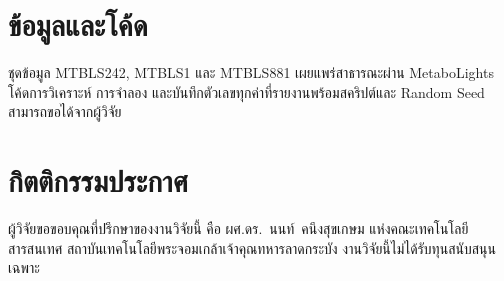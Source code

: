 \documentclass[11pt,a4paper]{article}
\begin{document}
\section*{ข้อมูลและโค้ด}
ชุดข้อมูล MTBLS242, MTBLS1 และ MTBLS881 เผยแพร่สาธารณะผ่าน MetaboLights \cite{haug2020}
โค้ดการวิเคราะห์ การจำลอง และบันทึกตัวเลขทุกค่าที่รายงานพร้อมสคริปต์และ Random Seed
สามารถขอได้จากผู้วิจัย

\section*{กิตติกรรมประกาศ}
ผู้วิจัยขอขอบคุณที่ปรึกษาของงานวิจัยนี้
คือ ผศ.ดร.~นนท์~คนึงสุขเกษม แห่งคณะเทคโนโลยีสารสนเทศ
สถาบันเทคโนโลยีพระจอมเกล้าเจ้าคุณทหารลาดกระบัง
งานวิจัยนี้ไม่ได้รับทุนสนับสนุนเฉพาะ
\end{document}
